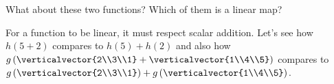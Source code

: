 \documentclass{ximera}
\begin{document}
\begin{question}
\begin{solution}
\begin{multiple-choice}
    \end{multiple-choice}
  \end{solution}

  What about these two functions?  Which of them is a linear map?
  \begin{solution}
 
    \begin{hint}
    	For a function to be linear, it must respect scalar addition.  Let's see how $h(5+2)$ compares to 
    	$h(5)+h(2)$ and also how $g\left( \verticalvector{2\\3\\1}+\verticalvector{1\\4\\5}\right)$ compares to 
    	$g\left(\verticalvector{2\\3\\1}\right)+g\left( \verticalvector{1\\4\\5}\right)$.
	
        \begin{question}
        	
       
        	

\end{question}
\end{hint}
\end{solution}
\end{question}
\end{document}

